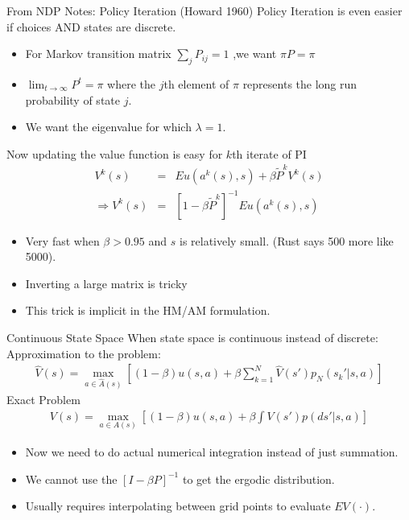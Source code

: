 \documentclass[xcolor=pdftex,dvipsnames,table,mathserif]{beamer}
\begin{document}
\begin{frame}{From NDP Notes:  Policy Iteration (Howard 1960)}
Policy Iteration is even easier if choices AND states are discrete.
\begin{itemize}
\item For Markov transition matrix $\sum_j P_{ij} =1$ ,we want $\pi P = \pi$
\item $\lim_{t \rightarrow \infty} P^t = \pi$ where the $j$th element of $\pi$ represents the long run probability of state $j$.
\item We want the eigenvalue for which $\lambda = 1$.
\end{itemize}
Now updating the value function is easy for $k$th iterate of PI
\begin{eqnarray*}
V^k(s) &=& Eu(a^k(s),s) + \beta \tilde{P}^k V^k(s)\\
\Rightarrow V^k(s) &=& [1 - \beta \tilde{P}^k]^{-1} Eu(a^k(s),s)
\end{eqnarray*}
\begin{itemize}
\item Very fast when $\beta > 0.95$ and $s$ is relatively small. (Rust says 500 more like 5000).
\item Inverting a large matrix is tricky
\item \alert{This trick is implicit in the HM/AM formulation}.
\end{itemize}
\end{frame}


\begin{frame}{Continuous State Space}
When state space is continuous instead of discrete:\\
Approximation to the problem:
\begin{eqnarray*}
\hat{V}(s) = \max_{a \in \hat{A}(s)} \left[ (1-\beta) u(s,a) + \beta \sum_{k=1}^N \hat{V}(s')p_N (s_k' | s,a) \right]
\end{eqnarray*}
Exact Problem
\begin{eqnarray*}
V(s) = \max_{a \in A(s)} \left[ (1-\beta) u(s,a) + \beta \int V(s')p(ds' | s,a) \right]
\end{eqnarray*}
\begin{itemize}
\item Now we need to do actual numerical integration instead of just summation.
\item We cannot use the $[I- \beta P]^{-1}$ to get the ergodic distribution.
\item Usually requires interpolating between grid points to evaluate $EV(\cdot)$.
\end{itemize}
\end{frame}
\end{document}
